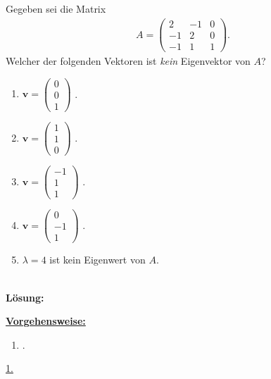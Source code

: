 \newpage

\subsection*{}
Gegeben sei die Matrix
\begin{align*}
	A =
	\begin{pmatrix}
		2 & -1 & 0 \\
		-1 & 2 & 0 \\
		-1 & 1 & 1
	\end{pmatrix}
	.
\end{align*}
Welcher der folgenden Vektoren ist \textit{kein} Eigenvektor von $A$?
\renewcommand{\labelenumi}{(\alph{enumi})}
\begin{enumerate}
	\item 
	$ 
	\mathbf{v}
	=
	\begin{pmatrix}
		0\\ 0 \\ 1
	\end{pmatrix}
	$
	.
	\item 
	$ 
	\mathbf{v}
	=
	\begin{pmatrix}
		1\\ 1 \\ 0
	\end{pmatrix}
	$
	.
	\item
	$ 
	\mathbf{v}
	=
	\begin{pmatrix}
		-1\\ 1 \\ 1
	\end{pmatrix}
	$
	.
	\item
	$ 
	\mathbf{v}
	=
	\begin{pmatrix}
		0\\ -1 \\ 1
	\end{pmatrix}
	$
	.
	\item
	$ \lambda = 4 $ ist kein Eigenwert von $ A $.
\end{enumerate}
\ \\
\textbf{Lösung:}
\begin{mdframed}
\underline{\textbf{Vorgehensweise:}}
\renewcommand{\labelenumi}{\theenumi.}
\begin{enumerate}
\item .
\end{enumerate}
\end{mdframed}

\underline{1. }\\



